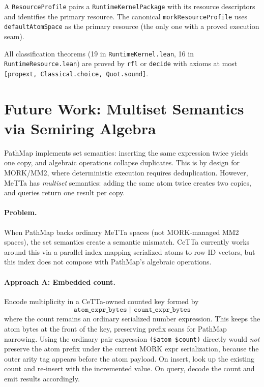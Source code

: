 \documentclass[11pt]{article}
\theoremstyle{definition}
\theoremstyle{remark}
\newcommand{\MORK}{\textup{MORK}}
\newcommand{\MeTTa}{\textup{MeTTa}}
\newcommand{\CeTTa}{\textup{CeTTa}}
\newcommand{\PathMap}{\textup{PathMap}}
\begin{document}
A \texttt{ResourceProfile} pairs a \texttt{RuntimeKernelPackage} with its
resource descriptors and identifies the primary resource.
The canonical \texttt{morkResourceProfile} uses \texttt{defaultAtomSpace}
as the primary resource (the only one with a proved execution seam).

All classification theorems (19 in \texttt{RuntimeKernel.lean},
16 in \texttt{RuntimeResource.lean}) are proved by \texttt{rfl} or
\texttt{decide} with axioms at most \texttt{[propext, Classical.choice,
Quot.sound]}.

\section*{Future Work: Multiset Semantics via Semiring Algebra}
\label{sec:future-multiset}

\PathMap{} implements set semantics: inserting the same expression twice
yields one copy, and algebraic operations collapse duplicates.  This is
by design for \MORK{}/MM2, where deterministic execution requires
deduplication.  However, \MeTTa{} has \emph{multiset} semantics: adding
the same atom twice creates two copies, and queries return one result
per copy.

\paragraph{Problem.}
When \PathMap{} backs ordinary \MeTTa{} spaces (not \MORK{}-managed MM2
spaces), the set semantics create a semantic mismatch.  \CeTTa{}
currently works around this via a parallel index mapping serialized
atoms to row-ID vectors, but this index does not compose with
\PathMap{}'s algebraic operations.

\paragraph{Approach A: Embedded count.}
Encode multiplicity in a CeTTa-owned counted key formed by
\[
  \texttt{atom\_expr\_bytes} \;\Vert\; \texttt{count\_expr\_bytes}
\]
where the count remains an ordinary serialized number expression.  This keeps
the atom bytes at the front of the key, preserving prefix scans for PathMap
narrowing.  Using the ordinary pair expression \texttt{(\$atom \$count)}
directly would \emph{not} preserve the atom prefix under the current MORK expr
serialization, because the outer arity tag appears before the atom payload.
On insert, look up the existing count and re-insert with the incremented value.
On query, decode the count and emit results accordingly.
\end{document}
